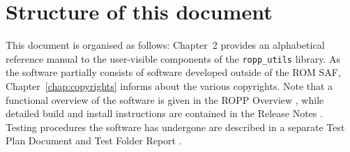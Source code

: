 

\section{Structure of this document}

This document is organised as follows: Chapter~2 provides an
alphabetical reference manual to the user-visible components of the
\texttt{ropp\_utils} library. As the software partially consists of
software developed outside of the ROM SAF,
Chapter~\ref{chap:copyrights} informs about the various copyrights.
Note that a functional overview of the software is given in the ROPP
Overview \citep{romsaf_ov}, while detailed build and install instructions 
are contained in the Release Notes \citep{romsaf_srn}. Testing
procedures the software has undergone are described in a separate Test
Plan Document \citep{romsaf_testplan} and Test Folder Report 
\citep{romsaf_testrep}.







